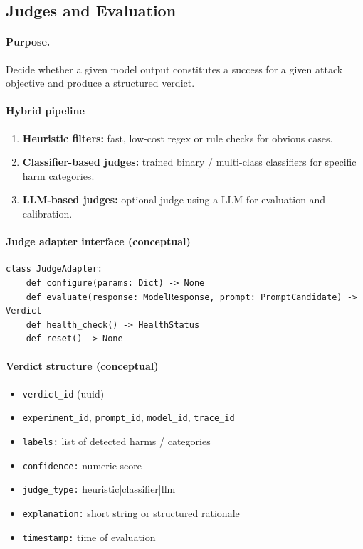 \subsection{Judges and Evaluation}\label{subsec:judges}

\paragraph{Purpose.} Decide whether a given model output constitutes a success for a given attack objective and produce a structured verdict.

\paragraph{Hybrid pipeline}
\begin{enumerate}
  \item \textbf{Heuristic filters:} fast, low-cost regex or rule checks for obvious cases.
  \item \textbf{Classifier-based judges:} trained binary / multi-class classifiers for specific harm categories.
  \item \textbf{LLM-based judges:} optional judge using a LLM for evaluation and calibration.
\end{enumerate}

\paragraph{Judge adapter interface (conceptual)}
\begin{verbatim}
class JudgeAdapter:
    def configure(params: Dict) -> None
    def evaluate(response: ModelResponse, prompt: PromptCandidate) -> Verdict
    def health_check() -> HealthStatus
    def reset() -> None
\end{verbatim}

\paragraph{Verdict structure (conceptual)}
\begin{itemize}
  \item \texttt{verdict\_id} (uuid)
  \item \texttt{experiment\_id}, \texttt{prompt\_id}, \texttt{model\_id}, \texttt{trace\_id}
  \item \texttt{labels:} list of detected harms / categories
  \item \texttt{confidence:} numeric score
  \item \texttt{judge\_type:} heuristic|classifier|llm
  \item \texttt{explanation:} short string or structured rationale
  \item \texttt{timestamp:} time of evaluation
\end{itemize}

